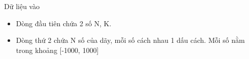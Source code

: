 Dữ liệu vào
\begin{itemize}
	\item     Dòng đầu tiên chứa 2 số N, K.   
\end{itemize}
\begin{itemize}
	\item     Dòng thứ 2 chứa N số của dãy, mỗi số cách nhau 1 dấu cách. Mỗi số nằm trong khoảng [-1000, 1000]   
\end{itemize}